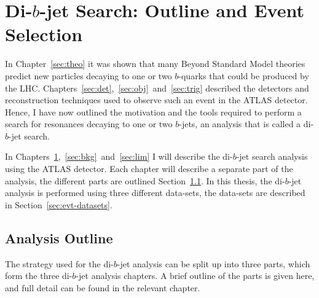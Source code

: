 \chapter{Di-$b$-jet Search: Outline and Event Selection}
\label{sec:evt}

In Chapter~\ref{sec:theo} it was shown that many Beyond Standard Model theories
predict new particles decaying to one or two $b$-quarks that could be produced by the LHC.
Chapters~\ref{sec:det},~\ref{sec:obj}~and~\ref{sec:trig}
described the detectors and reconstruction techniques used to observe such an event in the ATLAS detector.
Hence, I have now outlined the motivation and the tools required to perform
a search for resonances decaying to one or two $b$-jets,
an analysis that is called a di-$b$-jet search.

In Chapters~\ref{sec:evt},~\ref{sec:bkg}~and~\ref{sec:lim}
I will describe the di-$b$-jet search analysis using the ATLAS detector.
Each chapter will describe a separate part of the analysis,
the different parts are outlined Section~\ref{sec:evt-outline}.
In this thesis, the di-$b$-jet analysis is performed using three different data-sets,
the data-sets are described in Section~\ref{sec:evt-datasets}.

\section{Analysis Outline}
\label{sec:evt-outline}

The strategy used for the di-$b$-jet analysis
can be split up into three parts,
which form the three di-$b$-jet analysis chapters.
A brief outline of the parts is given here,
and full detail can be found in the relevant chapter.

